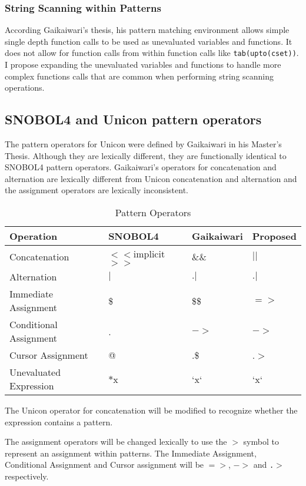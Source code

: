 \documentclass{article}
\begin{document}
\subsubsection{String Scanning within Patterns}
According Gaikaiwari's thesis, his pattern matching environment allows simple single depth function calls to be used as unevaluated variables and functions.  It does not allow for function calls from within function calls like \texttt{tab(upto(cset))}.\cite{Gaikaiwari2005}  I propose expanding the unevaluated variables and functions to handle more complex functions calls that are common when performing string scanning operations.

\subsection{SNOBOL4 and Unicon pattern operators}
The pattern operators for Unicon were defined by Gaikaiwari in his Master's Thesis.  Although they are lexically different, they are functionally identical to SNOBOL4 pattern operators.  Gaikaiwari's operators for concatenation and alternation are lexically different from Unicon concatenation and alternation and the assignment operators are lexically inconsistent.  

\begin{table}[ht]
	\caption{Pattern Operators}
	\centering
	\begin{tabular}{|l|l|l|l|}
		\hline\hline
		Operation & SNOBOL4 & Gaikaiwari & Proposed\\
		\hline
		Concatenation & $<<$implicit$>>$ & \&\& & $||$ \\
		Alternation & $|$ & $.|$ & $.|$ \\
		\hline
		Immediate Assignment & \$ & \$\$ & $=>$ \\
		Conditional Assignment & . & $->$ & $->$\\
		Cursor Assignment & @ & .\$ & .$>$ \\
		\hline
		Unevaluated Expression & $*$x & `x` & `x` \\
		\hline
	\end{tabular}
\end{table}

The Unicon operator for concatenation will be modified to recognize whether the expression contains a pattern.

The assignment operators will be changed lexically to use the \texttt{$>$} symbol to represent an assignment within patterns.  The Immediate Assignment, Conditional Assignment and Cursor assignment will be \texttt{$=>$}, \texttt{$->$} and \texttt{.$>$} respectively.
\end{document}
